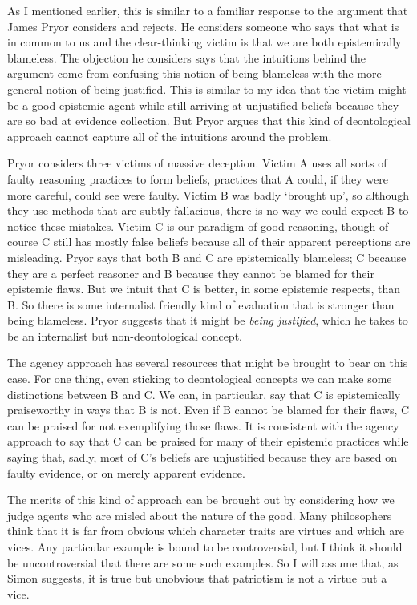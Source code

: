 As I mentioned earlier, this is similar to a familiar response to the argument that James Pryor considers and rejects. He considers someone who says that what is in common to us and the clear\nobreakdash-thinking victim is that we are both epistemically blameless. The objection he considers says that the intuitions behind the argument come from confusing this notion of being blameless with the more general notion of being justified. This is similar to my idea that the victim might be a good epistemic agent while still arriving at unjustified beliefs because they are so bad at evidence collection. But Pryor argues that this kind of deontological approach cannot capture all of the intuitions around the problem.

Pryor considers three victims of massive deception. Victim A uses all sorts of faulty reasoning practices to form beliefs, practices that A could, if they were more careful, could see were faulty. Victim B was badly `brought up', so although they use methods that are subtly fallacious, there is no way we could expect B to notice these mistakes. Victim C is our paradigm of good reasoning, though of course C still has mostly false beliefs because all of their apparent perceptions are misleading. Pryor says that both B and C are epistemically blameless; C because they are a perfect reasoner and B because they cannot be blamed for their epistemic flaws. But we intuit that C is better, in some epistemic respects, than B. So there is some internalist friendly kind of evaluation that is stronger than being blameless. Pryor suggests that it might be \textit{being justified}, which he takes to be an internalist but non-deontological concept. 

The agency approach has several resources that might be brought to bear on this case. For one thing, even sticking to deontological concepts we can make some distinctions between B and C. We can, in particular, say that C is epistemically praiseworthy in ways that B is not. Even if B cannot be blamed for their flaws, C can be praised for not exemplifying those flaws. It is consistent with the agency approach to say that C can be praised for many of their epistemic practices while saying that, sadly, most of C's beliefs are unjustified because they are based on faulty evidence, or on merely apparent evidence.

The merits of this kind of approach can be brought out by considering how we judge agents who are misled about the nature of the good. Many philosophers think that it is far from obvious which character traits are virtues and which are vices. Any particular example is bound to be controversial, but I think it should be uncontroversial that there are some such examples. So I will assume that, as Simon \citet{Keller2005} suggests, it is true but unobvious that patriotism is not a virtue but a vice. 

